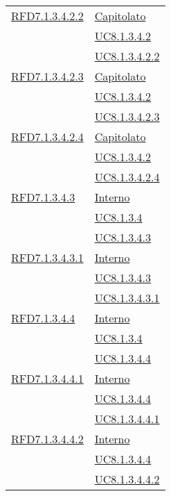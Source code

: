 \begin{longtable}{|>{\centering}m{5cm}|m{5cm}<{\centering}|}
\hyperlink{RFD7.1.3.4.2.2}{RFD7.1.3.4.2.2} & \hyperlink{Capitolato}{Capitolato}\\
& \hyperref[UC8.1.3.4.2]{UC8.1.3.4.2}\\
& \hyperref[UC8.1.3.4.2.2]{UC8.1.3.4.2.2}\\ \hline

\hyperlink{RFD7.1.3.4.2.3}{RFD7.1.3.4.2.3} & \hyperlink{Capitolato}{Capitolato}\\
& \hyperref[UC8.1.3.4.2]{UC8.1.3.4.2}\\
& \hyperref[UC8.1.3.4.2.3]{UC8.1.3.4.2.3}\\ \hline

\hyperlink{RFD7.1.3.4.2.4}{RFD7.1.3.4.2.4} & \hyperlink{Capitolato}{Capitolato}\\
& \hyperref[UC8.1.3.4.2]{UC8.1.3.4.2}\\
& \hyperref[UC8.1.3.4.2.4]{UC8.1.3.4.2.4}\\ \hline

\hyperlink{RFD7.1.3.4.3}{RFD7.1.3.4.3} & \hyperlink{Interno}{Interno}\\
& \hyperref[UC8.1.3.4]{UC8.1.3.4}\\
& \hyperref[UC8.1.3.4.3]{UC8.1.3.4.3}\\ \hline

\hyperlink{RFD7.1.3.4.3.1}{RFD7.1.3.4.3.1} & \hyperlink{Interno}{Interno}\\
& \hyperref[UC8.1.3.4.3]{UC8.1.3.4.3}\\
& \hyperref[UC8.1.3.4.3.1]{UC8.1.3.4.3.1}\\ \hline

\hyperlink{RFD7.1.3.4.4}{RFD7.1.3.4.4} & \hyperlink{Interno}{Interno}\\
& \hyperref[UC8.1.3.4]{UC8.1.3.4}\\
& \hyperref[UC8.1.3.4.4]{UC8.1.3.4.4}\\ \hline

\hyperlink{RFD7.1.3.4.4.1}{RFD7.1.3.4.4.1} & \hyperlink{Interno}{Interno}\\
& \hyperref[UC8.1.3.4.4]{UC8.1.3.4.4}\\
& \hyperref[UC8.1.3.4.4.1]{UC8.1.3.4.4.1}\\ \hline

\hyperlink{RFD7.1.3.4.4.2}{RFD7.1.3.4.4.2} & \hyperlink{Interno}{Interno}\\
& \hyperref[UC8.1.3.4.4]{UC8.1.3.4.4}\\
& \hyperref[UC8.1.3.4.4.2]{UC8.1.3.4.4.2}\\ \hline


\end{longtable}

